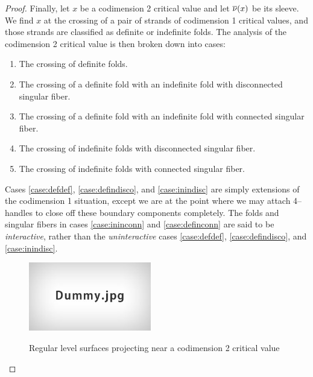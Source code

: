 \begin{proof}
	Finally, let $x$ be a codimension 2 critical value and let $\overline{\nu}(x)$ be its sleeve.
	We find $x$ at the crossing of a pair of strands of codimension 1 critical values, and those strands are classified as definite or indefinite folds.
	The analysis of the codimension 2 critical value is then broken down into cases:
	\begin{enumerate}[label=(\alph*)]
		\item \label{case:defdef} The crossing of definite folds.
		\item \label{case:defindisco} The crossing of a definite fold with an indefinite fold with disconnected singular fiber.
		\item \label{case:definconn} The crossing of a definite fold with an indefinite fold with connected singular fiber.
		\item \label{case:inindisc} The crossing of indefinite folds with disconnected singular fiber.
		\item \label{case:ininconn} The crossing of indefinite folds with connected singular fiber.
	\end{enumerate}
	Cases \ref{case:defdef}, \ref{case:defindisco}, and \ref{case:inindisc} are simply extensions of the codimension 1 situation, except we are at the point where we may attach 4--handles to close off these boundary components completely.
	The folds and singular fibers in cases \ref{case:ininconn} and \ref{case:definconn} are said to be \emph{interactive}, rather than the \emph{uninteractive} cases \ref{case:defdef}, \ref{case:defindisco}, and \ref{case:inindisc}.
	
	\begin{figure}
		\centering
		\captionsetup{justification=centering}
		\caption{Regular level surfaces projecting near a codimension 2 critical value}
		\includegraphics[height=3cm]{figures/dummy.jpg}
		\label{fig:regprojcodim2}
	\end{figure}
	

\end{proof}
